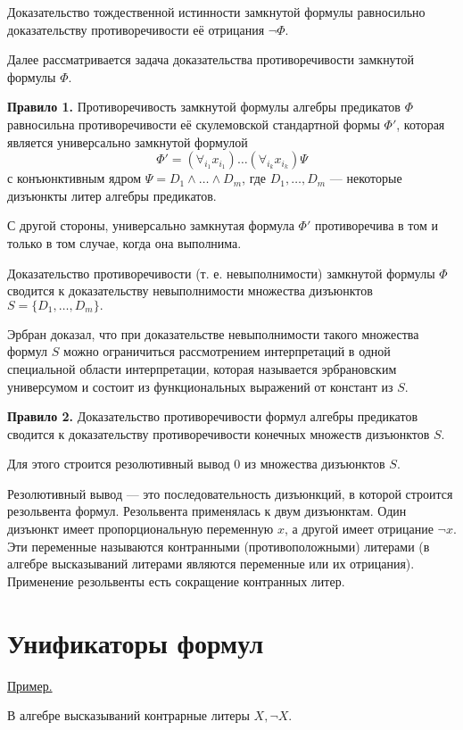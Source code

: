\documentclass{article}
\begin{document}
Доказательство тождественной истинности замкнутой формулы  равносильно доказательству противоречивости её отрицания $\neg \Phi$.

Далее рассматривается задача доказательства противоречивости замкнутой формулы $\Phi$.

{\bf Правило 1.} Противоречивость замкнутой формулы алгебры предикатов $\Phi$ равносильна противоречивости её скулемовской стандартной формы $\Phi'$, которая является универсально замкнутой формулой
\begin{equation*}
    \Phi' = (\forall_{i_1}x_{i_1})\dots(\forall_{i_k}x_{i_k})\Psi
\end{equation*}
с конъюнктивным ядром $\Psi = D_1\land\dots\land D_m$, где $D_1,\dots,D_m$ --- некоторые дизъюнкты литер алгебры предикатов.

С другой стороны, универсально замкнутая формула $\Phi'$ противоречива в том и только в том случае, когда она выполнима.

Доказательство противоречивости (т. е. невыполнимости) замкнутой формулы $\Phi$ сводится к доказательству невыполнимости множества дизъюнктов $S = \{D_1,\dots,D_m\}.$

Эрбран доказал, что при доказательстве невыполнимости такого множества формул $S$ можно ограничиться рассмотрением интерпретаций в одной специальной области интерпретации, которая называется эрбрановским универсумом и состоит из функциональных выражений от констант из $S$.

{\bf Правило 2.} Доказательство противоречивости формул алгебры предикатов сводится к доказательству противоречивости конечных множеств дизъюнктов $S$.

Для этого строится резолютивный вывод 0 из множества дизъюнктов $S$.

Резолютивный вывод --- это последовательность дизъюнкций, в которой строится резольвента формул. Резольвента применялась к двум дизъюнктам. Один дизъюнкт имеет пропорциональную переменную $x$, а другой имеет отрицание $\neg x$. Эти переменные называются контранными (противоположными) литерами (в алгебре высказываний литерами являются переменные или их отрицания). Применение резольвенты есть сокращение контранных литер.

\section{Унификаторы формул}

\underline{Пример.}

В алгебре высказываний контрарные литеры $X, \neg X$.
\end{document}
